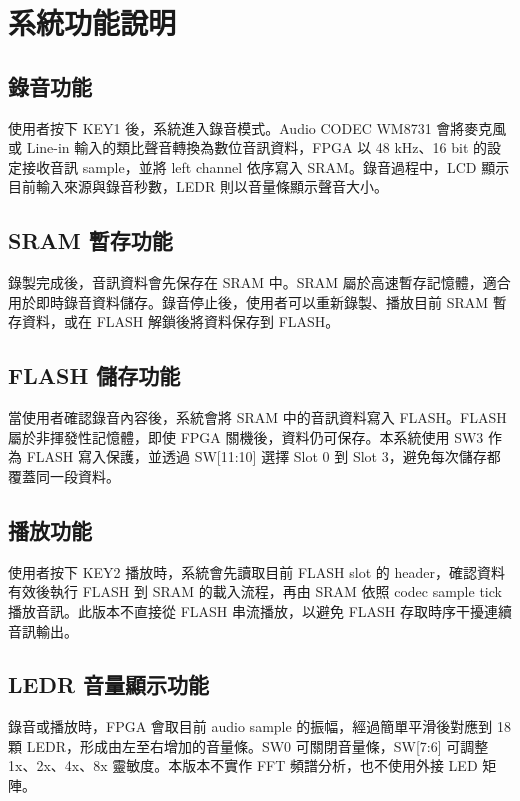 \section{系統功能說明}

\subsection{錄音功能}

使用者按下 KEY1 後，系統進入錄音模式。Audio CODEC WM8731 會將麥克風或 Line-in 輸入的類比聲音轉換為數位音訊資料，FPGA 以 48 kHz、16 bit 的設定接收音訊 sample，並將 left channel 依序寫入 SRAM。錄音過程中，LCD 顯示目前輸入來源與錄音秒數，LEDR 則以音量條顯示聲音大小。

\subsection{SRAM 暫存功能}

錄製完成後，音訊資料會先保存在 SRAM 中。SRAM 屬於高速暫存記憶體，適合用於即時錄音資料儲存。錄音停止後，使用者可以重新錄製、播放目前 SRAM 暫存資料，或在 FLASH 解鎖後將資料保存到 FLASH。

\subsection{FLASH 儲存功能}

當使用者確認錄音內容後，系統會將 SRAM 中的音訊資料寫入 FLASH。FLASH 屬於非揮發性記憶體，即使 FPGA 關機後，資料仍可保存。本系統使用 SW3 作為 FLASH 寫入保護，並透過 SW[11:10] 選擇 Slot 0 到 Slot 3，避免每次儲存都覆蓋同一段資料。

\subsection{播放功能}

使用者按下 KEY2 播放時，系統會先讀取目前 FLASH slot 的 header，確認資料有效後執行 FLASH 到 SRAM 的載入流程，再由 SRAM 依照 codec sample tick 播放音訊。此版本不直接從 FLASH 串流播放，以避免 FLASH 存取時序干擾連續音訊輸出。

\subsection{LEDR 音量顯示功能}

錄音或播放時，FPGA 會取目前 audio sample 的振幅，經過簡單平滑後對應到 18 顆 LEDR，形成由左至右增加的音量條。SW0 可關閉音量條，SW[7:6] 可調整 1x、2x、4x、8x 靈敏度。本版本不實作 FFT 頻譜分析，也不使用外接 LED 矩陣。
